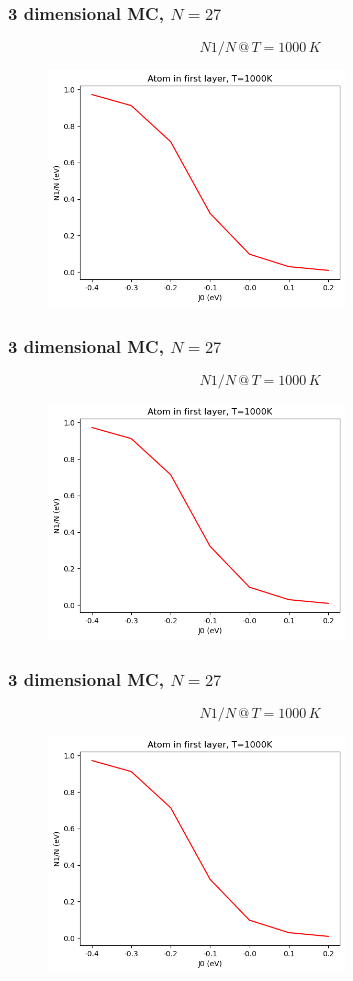\documentclass{beamer}
\begin{document}
\begin{frame}
    \frametitle{3 dimensional MC, $N=27$}

    $$N1/N \,@\, T=1000\,K$$
    
    \begin{figure}
        \includegraphics[width=0.7\textwidth]{images/dratio1000K.png}
    \end{figure}

\end{frame}

\begin{frame}
    \frametitle{3 dimensional MC, $N=27$}

    $$N1/N \,@\, T=1000\,K$$
    
    \begin{figure}
        \includegraphics[width=0.7\textwidth]{images/dratio1000K.png}
    \end{figure}

\end{frame}

\begin{frame}
    \frametitle{3 dimensional MC, $N=27$}

    $$N1/N \,@\, T=1000\,K$$
    
    \begin{figure}
        \includegraphics[width=0.7\textwidth]{images/dratio1000K.png}
    \end{figure}

\end{frame}
\end{document}
